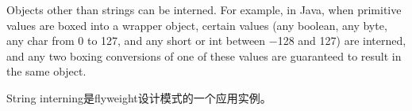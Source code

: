 Objects other than strings can be interned. For example, in Java, when primitive values are boxed into a wrapper object, certain values (any boolean, any byte, any char from 0 to 127, and any short or int between −128 and 127) are interned, and any two boxing conversions of one of these values are guaranteed to result in the same object.


String interning是flyweight设计模式的一个应用实例。






























